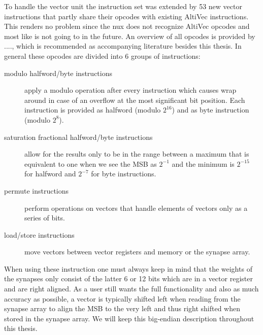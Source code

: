 To handle the vector unit the instruction set was extended by 53 new vector instructions that partly share their opcodes with existing AltiVec instructions.
This renders no problem since the nux does not recognize AltiVec opcodes and most like is not going to in the future.
An overview of all opcodes is provided by ...., which is recommended as accompanying literature besides this thesis.
In general these opcodes are divided into 6 groups of instructions:
\begin{description}
    \item[modulo halfword/byte instructions] apply a modulo operation after every instruction which causes wrap around in case of an overflow at the most significant bit position.
        Each instruction is provided as halfword (modulo $2^{16}$) and as byte instruction (modulo $2^{8}$).
    \item[saturation fractional halfword/byte instructions] allow for the results only to be in the range between a maximum that is equivalent to one when we see the MSB as $2^{-1}$ and the minimum is $2^{-15}$ for halfword and $2^{-7}$ for byte instructions. 
    \item[permute instructions] perform operations on vectors that handle elements of vectors only as a series of bits.
    \item[load/store instructions] move vectors between vector registers and memory or the synapse array.
\end{description}

When using these instruction one must always keep in mind that the weights of the synapses only consist of the latter 6 or 12 bits which are in a vector register and are right aligned.
As a user still wants the full functionality and also as much accuracy as possible, a vector is typically shifted left when reading from the synapse array to  align the MSB to the very left and thus right shifted when stored in the synapse array.
We will keep this big-endian description throughout this thesis.



